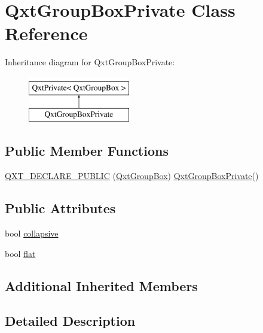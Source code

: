 \hypertarget{class_qxt_group_box_private}{\section{Qxt\-Group\-Box\-Private Class Reference}
\label{class_qxt_group_box_private}
}
Inheritance diagram for Qxt\-Group\-Box\-Private\-:\begin{figure}[H]
\begin{center}
\leavevmode
\includegraphics[height=2.000000cm]{class_qxt_group_box_private}
\end{center}
\end{figure}
\subsection*{Public Member Functions}
\begin{DoxyCompactItemize}
\item 
\hyperlink{class_qxt_group_box_private_a5cb97b5caa8f0a91915f003271d50973}{Q\-X\-T\-\_\-\-D\-E\-C\-L\-A\-R\-E\-\_\-\-P\-U\-B\-L\-I\-C} (\hyperlink{class_qxt_group_box}{Qxt\-Group\-Box}) \hyperlink{class_qxt_group_box_private}{Qxt\-Group\-Box\-Private}()
\end{DoxyCompactItemize}
\subsection*{Public Attributes}
\begin{DoxyCompactItemize}
\item 
bool \hyperlink{class_qxt_group_box_private_a72b0274485f6ee79844714150a9e20c3}{collapsive}
\item 
bool \hyperlink{class_qxt_group_box_private_a26081b88b2cd0da7c3b4e3796a7903bd}{flat}
\end{DoxyCompactItemize}
\subsection*{Additional Inherited Members}


\subsection{Detailed Description}


